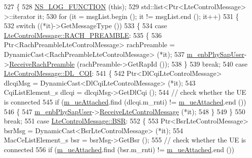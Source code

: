 \begin{DoxyCode}
527 \{
528   \hyperlink{log-macros-disabled_8h_a90b90d5bad1f39cb1b64923ea94c0761}{NS\_LOG\_FUNCTION} (\textcolor{keyword}{this});
529   std::list<Ptr<LteControlMessage> >::iterator it;
530   \textcolor{keywordflow}{for} (it = msgList.begin (); it != msgList.end (); it++)
531     \{
532       \textcolor{keywordflow}{switch} ((*it)->GetMessageType ())
533         \{
534         \textcolor{keywordflow}{case} \hyperlink{classns3_1_1LteControlMessage_a9f9798d5aa8ad40f6432285b4b06135ba6b065fc9e647392aec348af9eda0bcea}{LteControlMessage::RACH\_PREAMBLE}:
535           \{
536             Ptr<RachPreambleLteControlMessage> rachPreamble = DynamicCast<RachPreambleLteControlMessage> 
      (*it);
537             \hyperlink{classns3_1_1LteEnbPhy_a731048734464383920acca0e20a1f020}{m\_enbPhySapUser}->\hyperlink{classns3_1_1LteEnbPhySapUser_a954e3c5ca07e0bf9f7a7f415a3c19bd5}{ReceiveRachPreamble} (rachPreamble->GetRapId 
      ());
538           \}
539           \textcolor{keywordflow}{break};
540         \textcolor{keywordflow}{case} \hyperlink{classns3_1_1LteControlMessage_a9f9798d5aa8ad40f6432285b4b06135ba10d476b2cfd1b772dd6364fc1b752aa3}{LteControlMessage::DL\_CQI}:
541           \{
542             Ptr<DlCqiLteControlMessage> dlcqiMsg = DynamicCast<DlCqiLteControlMessage> (*it);
543             CqiListElement\_s dlcqi = dlcqiMsg->GetDlCqi ();
544             \textcolor{comment}{// check whether the UE is connected}
545             \textcolor{keywordflow}{if} (\hyperlink{classns3_1_1LteEnbPhy_a226e8d8e856ac3b90d45db11bbe23400}{m\_ueAttached}.find (dlcqi.m\_rnti) != \hyperlink{classns3_1_1LteEnbPhy_a226e8d8e856ac3b90d45db11bbe23400}{m\_ueAttached}.end ())
546               \{
547                 \hyperlink{classns3_1_1LteEnbPhy_a731048734464383920acca0e20a1f020}{m\_enbPhySapUser}->\hyperlink{classns3_1_1LteEnbPhySapUser_a8fb3e9a7b3e6820d2c0e5d1b2cb83195}{ReceiveLteControlMessage} (*it);
548               \}
549           \}
550           \textcolor{keywordflow}{break};
551         \textcolor{keywordflow}{case} \hyperlink{classns3_1_1LteControlMessage_a9f9798d5aa8ad40f6432285b4b06135bac8c418b47c2ff9a59c75df7be42ff7bd}{LteControlMessage::BSR}:
552           \{
553             Ptr<BsrLteControlMessage> bsrMsg = DynamicCast<BsrLteControlMessage> (*it);
554             MacCeListElement\_s bsr = bsrMsg->GetBsr ();
555             \textcolor{comment}{// check whether the UE is connected}
556             \textcolor{keywordflow}{if} (\hyperlink{classns3_1_1LteEnbPhy_a226e8d8e856ac3b90d45db11bbe23400}{m\_ueAttached}.find (bsr.m\_rnti) != \hyperlink{classns3_1_1LteEnbPhy_a226e8d8e856ac3b90d45db11bbe23400}{m\_ueAttached}.end ())

\end{DoxyCode}
